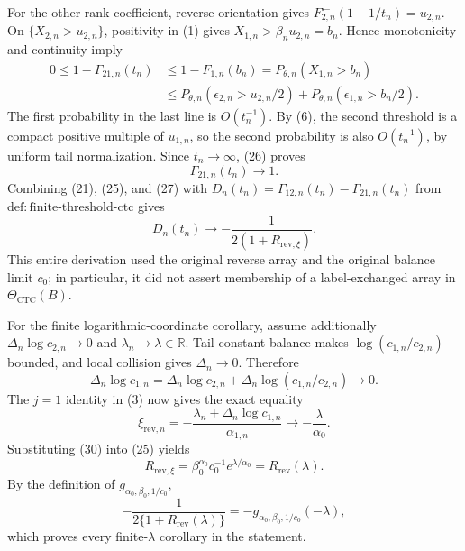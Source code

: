 For the other rank coefficient, reverse orientation gives
\(F_{2,n}^{\leftarrow}(1-1/t_n)=u_{2,n}\). On
\(\{X_{2,n}>u_{2,n}\}\), positivity in (1) gives
\(X_{1,n}>\beta_n u_{2,n}=b_n\). Hence monotonicity and continuity imply
\[
\begin{aligned}
0\leq1-\Gamma_{21,n}(t_n)
&\leq1-F_{1,n}(b_n)
=P_{\theta,n}(X_{1,n}>b_n)\\
&\leq P_{\theta,n}(\epsilon_{2,n}>u_{2,n}/2)
+P_{\theta,n}(\epsilon_{1,n}>b_n/2).
\end{aligned}
\tag{26}
\]
The first probability in the last line is \(O(t_n^{-1})\). By (6), the
second threshold is a compact positive multiple of \(u_{1,n}\), so the
second probability is also \(O(t_n^{-1})\), by uniform tail normalization.
Since \(t_n\to\infty\), (26) proves
\[
\Gamma_{21,n}(t_n)\longrightarrow1.
\tag{27}
\]
Combining (21), (25), and (27) with
\(D_n(t_n)=\Gamma_{12,n}(t_n)-\Gamma_{21,n}(t_n)\) from
\(\mathrm{def{:}finite\text{-}threshold\text{-}ctc}\) gives
\[
D_n(t_n)\longrightarrow-\frac{1}{2(1+R_{\mathrm{rev},\xi})}.
\tag{28}
\]
This entire derivation used the original reverse array and the original
balance limit \(c_0\); in particular, it did not assert membership of a
label-exchanged array in \(\Theta_{\mathrm{CTC}}(B)\).

For the finite logarithmic-coordinate corollary, assume additionally
\(\Delta_n\log c_{2,n}\to0\) and \(\lambda_n\to\lambda\in\mathbb R\).
Tail-constant balance makes \(\log(c_{1,n}/c_{2,n})\) bounded, and local
collision gives \(\Delta_n\to0\). Therefore
\[
\Delta_n\log c_{1,n}
=\Delta_n\log c_{2,n}
+\Delta_n\log(c_{1,n}/c_{2,n})
\longrightarrow0.
\tag{29}
\]
The \(j=1\) identity in (3) now gives the exact equality
\[
\xi_{\mathrm{rev},n}
=-\frac{\lambda_n+\Delta_n\log c_{1,n}}{\alpha_{1,n}}
\longrightarrow-\frac{\lambda}{\alpha_0}.
\tag{30}
\]
Substituting (30) into (25) yields
\[
R_{\mathrm{rev},\xi}
=\beta_0^{\alpha_0}c_0^{-1}e^{\lambda/\alpha_0}
=R_{\mathrm{rev}}(\lambda).
\tag{31}
\]
By the definition of \(g_{\alpha_0,\beta_0,1/c_0}\),
\[
-\frac{1}{2\{1+R_{\mathrm{rev}}(\lambda)\}}
=-g_{\alpha_0,\beta_0,1/c_0}(-\lambda),
\tag{32}
\]
which proves every finite-\(\lambda\) corollary in the statement.

